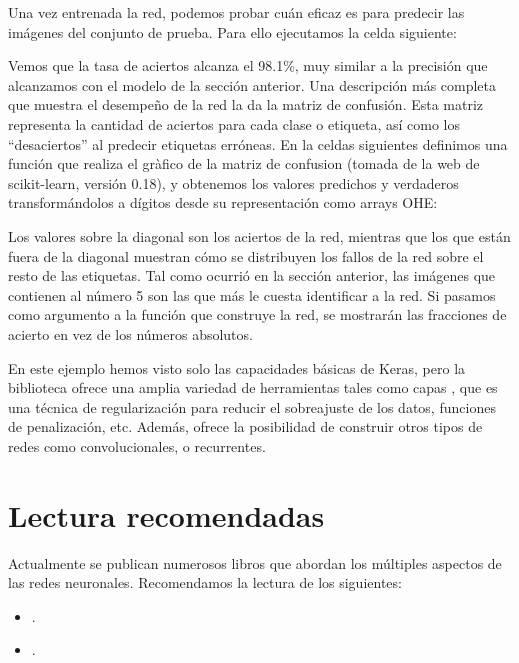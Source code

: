 Una vez entrenada la red, podemos probar cuán eficaz es para predecir las imágenes del conjunto de prueba. Para ello ejecutamos la celda siguiente:
 

Vemos que la tasa de aciertos alcanza el 98.1\%, muy similar a la precisión que alcanzamos con el modelo de la sección anterior. Una descripción más completa que muestra el desempeño de la red la da la matriz de confusión. Esta matriz representa la cantidad de aciertos para cada clase o etiqueta, así como los ``desaciertos'' al predecir etiquetas erróneas. En la celdas siguientes definimos una función que realiza el gràfico de la matriz de confusion (tomada de la web de scikit-learn, versión 0.18), y obtenemos los valores predichos y verdaderos transformándolos a dígitos desde su representación como arrays OHE:


Los valores sobre la diagonal son los aciertos de la red, mientras que los que están fuera de la diagonal muestran cómo se distribuyen los fallos de la red sobre el resto de las etiquetas. Tal como ocurrió en la sección anterior, las imágenes que contienen al número 5 son las que más le cuesta identificar a la red. Si pasamos como argumento  a la función que construye la red, se mostrarán las fracciones de acierto en vez de los números absolutos.

En este ejemplo hemos visto solo las capacidades básicas de Keras, pero la biblioteca ofrece una amplia variedad de herramientas tales como capas , que es una técnica de regularización para reducir el sobreajuste de los datos, funciones de penalización, etc. Además, ofrece la posibilidad de construir otros tipos de redes como convolucionales, o recurrentes.

\section{Lectura recomendadas}
Actualmente se publican numerosos libros que abordan los múltiples aspectos de las redes neuronales. Recomendamos la lectura de los siguientes:
\begin{itemize}
    \item {}.
    \item {}.
\end{itemize}



